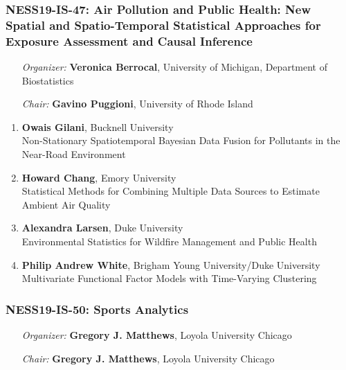 \subsubsection*{NESS19-IS-47: Air Pollution and Public Health: New Spatial and Spatio-Temporal Statistical Approaches for Exposure Assessment and Causal Inference}

\begin{enumerate}[align=left]
\item [\emph{Organizer:}] \textbf{Veronica Berrocal}, University of Michigan, Department of Biostatistics
\item [\emph{Chair:}] \textbf{Gavino Puggioni},  University of Rhode Island
\end{enumerate}

\begin{enumerate}
\item \textbf{Owais Gilani}, Bucknell University \\
Non-Stationary Spatiotemporal Bayesian Data Fusion for Pollutants in the Near-Road Environment
\item \textbf{Howard Chang}, Emory University \\
Statistical Methods for Combining Multiple Data Sources to Estimate Ambient Air Quality
\item \textbf{Alexandra Larsen}, Duke University \\
Environmental Statistics for Wildfire Management and Public Health
\item \textbf{Philip Andrew White}, Brigham Young University/Duke University \\
Multivariate Functional Factor Models with Time-Varying Clustering
\end{enumerate}

\subsubsection*{NESS19-IS-50: Sports Analytics}

\begin{enumerate}[align=left]
\item [\emph{Organizer:}] \textbf{Gregory J. Matthews}, Loyola University Chicago
\item [\emph{Chair:}] \textbf{Gregory J. Matthews}, Loyola University Chicago
\end{enumerate}

